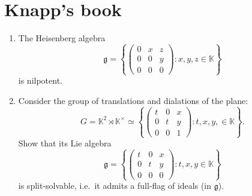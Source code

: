 \documentclass{report}
\begin{document}
\section{Knapp's book}
\begin{exercise}[Exercise I.1]
    \begin{enumerate}[label = (\roman*)]
        \item The Heisenberg algebra
        \[
        \mathfrak g = \left\{ \begin{pmatrix}
            0 & x & z\\
            0 & 0 & y\\
            0 & 0 & 0
        \end{pmatrix}: x,y,z \in \mathbb K \right\}
        \]
        is nilpotent.
        \item Consider the group of translations and dialations of the plane:
        \[
        G = \mathbb K^2 \rtimes \mathbb K^\times \simeq \left\{ \begin{pmatrix}
            t & 0 & x\\
            0 & t & y\\
            0 & 0 & 1
        \end{pmatrix} : t, x, y, \in \mathbb K \right\}.
        \]
        Show that its Lie algebra
        \[
        \mathfrak g = \left\{ \begin{pmatrix}
            t & 0 & x\\
            0 & t & y\\
            0 & 0 & 0
        \end{pmatrix}: t,x,y \in \mathbb K \right\}
        \]
        is split-solvable, i.e.\ it admits a full-flag of ideals (in $\mathfrak g$).
    \end{enumerate}
\end{exercise}
\end{document}
